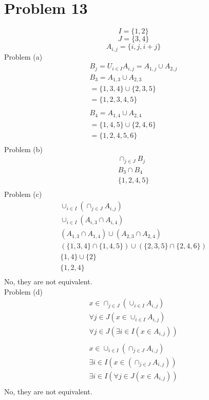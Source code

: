 \documentclass{article}
\begin{document}
\section{Problem 13}
$$ I = \{1,2\} $$
$$ J = \{3,4\} $$
$$ A_{i,j} = \{i, j, i+j\} $$
Problem (a)
\begin{align}
  B_j = U_{i \in I}A_{i,j} = A_{1,j} \cup A_{2,j} \\
  B_3 = A_{1,3} \cup A_{2,3} \\
  = \{ 1,3,4 \} \cup \{ 2,3,5 \} \\
  = \{1,2,3,4,5\} \\ \\
  B_4 = A_{1,4} \cup A_{2,4} \\
  = \{1,4,5\} \cup \{2,4,6\} \\
  = \{1,2,4,5,6\} \\
\end{align}
Problem (b)
\begin{align*}
  \cap_{j \in J}B_j \\
  B_3 \cap B_4 \\
  \{1,2,4,5\} \\
\end{align*}
Problem (c)
\begin{align*}
  \cup_{i \in I}(\cap_{j \in J}A_{i,j}) \\
  \cup_{i \in I}(A_{i,3} \cap A_{i,4}) \\
  (A_{1,3} \cap A_{1,4}) \cup (A_{2,3} \cap A_{2,4}) \\
  (\{1,3,4\} \cap \{1,4,5\}) \cup (\{2,3,5\} \cap \{2,4,6\}) \\
  \{1,4\} \cup \{2\} \\
  \{1,2,4\} \\
\end{align*}
No, they are not equivalent. \\
Problem (d)
\begin{align*}
  x \in \cap_{j \in J}(\cup_{i \in I}A_{i,j}) \\
  \forall j \in J(x \in \cup_{i \in I}A_{i,j})\\
  \forall j \in J(\exists i \in I(x \in A_{i,j}))\\ \\
  x \in \cup_{i \in I}(\cap_{j \in J}A_{i,j}) \\
  \exists i \in I(x \in (\cap_{j \in J}A_{i,j})) \\
  \exists i \in I(\forall j \in J(x \in A_{i,j}))\\
\end{align*}
  No, they are not equivalent.
\end{document}
